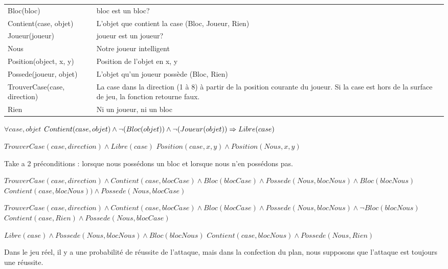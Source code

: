 \documentclass[12pt,letterpaper]{article}
\begin{document}
\begin{tabular}{p{2.2in} p{3.8in} }
    Bloc(bloc) & bloc est un bloc? \\[10pt]
    Contient(case, objet) & L'objet que contient la case (Bloc, Joueur, Rien) \\[10pt]
    Joueur(joueur) & joueur est un joueur? \\[10pt]
    Nous & Notre joueur intelligent \\[10pt]
    Position(object, x, y) & Position de l'objet en x, y \\[10pt]
    Possede(joueur, objet) & L'objet qu'un joueur possède (Bloc, Rien) \\[10pt]
    TrouverCase(case, direction) & La case dans la direction (1 à 8) à partir de la position courante du joueur. Si la case est hors de la surface de jeu, la fonction retourne faux. \\[10pt]
    Rien & Ni un joueur, ni un bloc \\[10pt]
\end{tabular}


$\forall case, objet$ $Contient(case, objet) \wedge \neg(Bloc(objet)) \wedge \neg(Joueur(objet)) \Rightarrow Libre(case)  \\$


        {$TrouverCase(case, direction) \wedge Libre(case)$}
        {$Position(case, x, y) \wedge Position(Nous, x, y)$}

Take a 2 préconditions : lorsque nous possédons un bloc et lorsque nous n'en possédons pas.

        {$TrouverCase(case, direction) \wedge Contient(case, blocCase) \wedge Bloc(blocCase) \wedge Possede(Nous, blocNous) \wedge Bloc(blocNous)$}
        {$ Contient(case, blocNous)) \wedge Possede(Nous, blocCase)$}

        {$TrouverCase(case, direction) \wedge Contient(case, blocCase) \wedge Bloc(blocCase) \wedge Possede(Nous, blocNous) \wedge \neg Bloc(blocNous)$}
        {$Contient(case, Rien) \wedge Possede(Nous, blocCase)$}

        {$Libre(case) \wedge Possede(Nous, blocNous) \wedge Bloc(blocNous)$}
        {$Contient(case, blocNous) \wedge Possede(Nous, Rien)$}

Dans le jeu réel, il y a une probabilité de réussite de l'attaque, mais dans la confection du plan, nous supposons que l'attaque est toujours une réussite.
\end{document}
